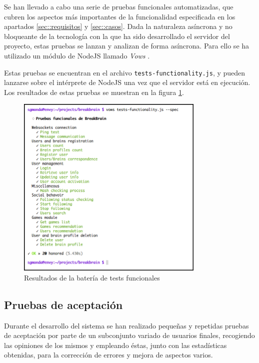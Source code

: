 Se han llevado a cabo una serie de pruebas funcionales automatizadas, que cubren los aspectos más importantes de la funcionalidad especificada en los apartados \ref{sec::requisitos} y \ref{sec::casos}. Dada la naturaleza asíncrona y no bloqueante de la tecnología con la que ha sido desarrollado el servidor del proyecto, estas pruebas se lanzan y analizan de forma asíncrona. Para ello se ha utilizado un módulo de NodeJS llamado \emph{Vows} \cite{Maecki}.

Estas pruebas se encuentran en el archivo {\tt tests-functionality.js}, y pueden lanzarse sobre el intérprete de NodeJS una vez que el servidor está en ejecución. Los resultados de estas pruebas se muestran en la figura \ref{fig::vows}.

\begin{figure}[h]
  \begin{center}
    \includegraphics[width=0.8\textwidth]{images/vows.png}
    \caption{Resultados de la batería de tests funcionales}
    \label{fig::vows}
  \end{center}
\end{figure}



\subsection{Pruebas de aceptación}

Durante el desarrollo del sistema se han realizado pequeñas y repetidas pruebas de aceptación por parte de un subconjunto variado de usuarios finales, recogiendo las opiniones de los mismos y empleando éstas, junto con las estadísticas obtenidas, para la corrección de errores y mejora de aspectos varios.

